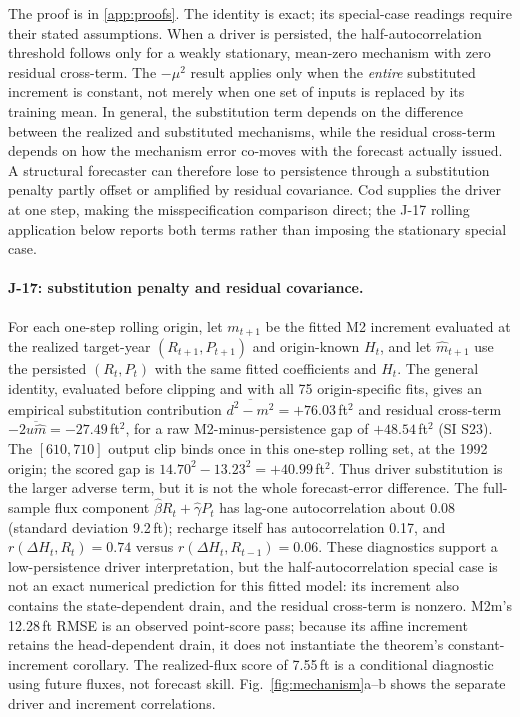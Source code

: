 \documentclass[preprint,11pt,authoryear]{elsarticle}
\theoremstyle{definition}
\theoremstyle{remark}
\begin{document}
The proof is in \ref{app:proofs}. The identity is exact; its special-case readings require their stated assumptions. When a driver is persisted, the half-autocorrelation threshold follows only for a weakly stationary, mean-zero mechanism with zero residual cross-term. The $-\mu^2$ result applies only when the \emph{entire} substituted increment is constant, not merely when one set of inputs is replaced by its training mean. In general, the substitution term depends on the difference between the realized and substituted mechanisms, while the residual cross-term depends on how the mechanism error co-moves with the forecast actually issued. A structural forecaster can therefore lose to persistence through a substitution penalty partly offset or amplified by residual covariance. Cod supplies the driver at one step, making the misspecification comparison direct; the J-17 rolling application below reports both terms rather than imposing the stationary special case.

\paragraph{J-17: substitution penalty and residual covariance.} For each one-step rolling origin, let $m_{t+1}$ be the fitted M2 increment evaluated at the realized target-year $(R_{t+1},P_{t+1})$ and origin-known $H_t$, and let $\hat m_{t+1}$ use the persisted $(R_t,P_t)$ with the same fitted coefficients and $H_t$. The general identity, evaluated before clipping and with all 75 origin-specific fits, gives an empirical substitution contribution $\overline{d^2-m^2}=+76.03$\,ft$^2$ and residual cross-term $-2\overline{u\hat m}=-27.49$\,ft$^2$, for a raw M2-minus-persistence gap of $+48.54$\,ft$^2$ (SI S23). The $[610,710]$ output clip binds once in this one-step rolling set, at the 1992 origin; the scored gap is $14.70^2-13.23^2=+40.99$\,ft$^2$. Thus driver substitution is the larger adverse term, but it is not the whole forecast-error difference. The full-sample flux component $\hat\beta R_t+\hat\gamma P_t$ has lag-one autocorrelation about 0.08 (standard deviation 9.2\,ft); recharge itself has autocorrelation 0.17, and $r(\Delta H_t,R_t)=0.74$ versus $r(\Delta H_t,R_{t-1})=0.06$. These diagnostics support a low-persistence driver interpretation, but the half-autocorrelation special case is not an exact numerical prediction for this fitted model: its increment also contains the state-dependent drain, and the residual cross-term is nonzero. M2m's 12.28\,ft RMSE is an observed point-score pass; because its affine increment retains the head-dependent drain, it does not instantiate the theorem's constant-increment corollary. The realized-flux score of 7.55\,ft is a conditional diagnostic using future fluxes, not forecast skill. Fig.~\ref{fig:mechanism}a--b shows the separate driver and increment correlations.
\end{document}
